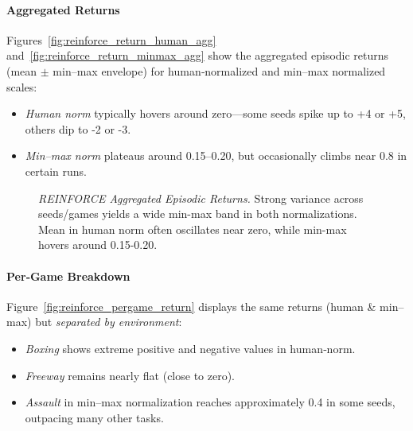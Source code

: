 \paragraph{Aggregated Returns}
Figures~\ref{fig:reinforce_return_human_agg} and~\ref{fig:reinforce_return_minmax_agg} show the aggregated episodic returns (mean $\pm$ min–max envelope) 
for human‐normalized and min--max normalized scales:
\begin{itemize}
	\item \emph{Human norm} typically hovers around zero—some seeds spike up to +4 or +5, others dip to -2 or -3.
	\item \emph{Min--max norm} plateaus around 0.15--0.20, but occasionally climbs near 0.8 in certain runs.
\end{itemize}

\begin{figure}
	\centering
	\quad
	\caption{\textit{REINFORCE Aggregated Episodic Returns.} 
		Strong variance across seeds/games yields a wide min-max band in both normalizations. 
		Mean in human norm often oscillates near zero, while min-max hovers around 0.15-0.20.}
	\label{fig:reinforce_returns_agg}
\end{figure}

\paragraph{Per‐Game Breakdown}
Figure~\ref{fig:reinforce_pergame_return} displays the same returns (human \& min--max) 
but \emph{separated by environment}:
\begin{itemize}
	\item \emph{Boxing} shows extreme positive and negative values in human‐norm.
	\item \emph{Freeway} remains nearly flat (close to zero).
	\item \emph{Assault} in min--max normalization reaches approximately 0.4 in some seeds, outpacing many other tasks.
\end{itemize}

